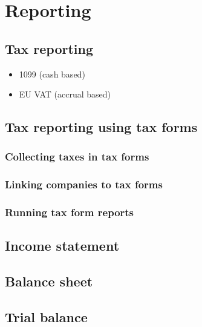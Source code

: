 \section{Reporting}
\label{sec-business-processes-accounting-reporting}

\subsection{Tax reporting}
\label{subsec-business-processes-accounting-reporting-tax}


\begin{itemize}
\item 1099 (cash based)
\item EU \gls{VAT} (accrual based)
\end{itemize}


\subsection{Tax reporting using tax forms}
\label{subsec-business-processes-accounting-reporting-tax-with-taxforms}

\subsubsection{Collecting taxes in tax forms}
\label{subsubsec-business-processes-accounting-reporting-tax-collecting-taxforms}

\subsubsection{Linking companies to tax forms}
\label{subsubsec-business-processes-accounting-reporting-tax-linking-taxforms}

\subsubsection{Running tax form reports}
\label{subsubsec-business-processes-accounting-reporting-tax-running-taxforms}


\subsection{Income statement}
\label{subsec-business-processes-accounting-reporting-result}


\subsection{Balance sheet}
\label{subsec-business-processes-accounting-reporting-balance}

\subsection{Trial balance}
\label{subsec-business-processes-accounting-reporting-trial-balance}

